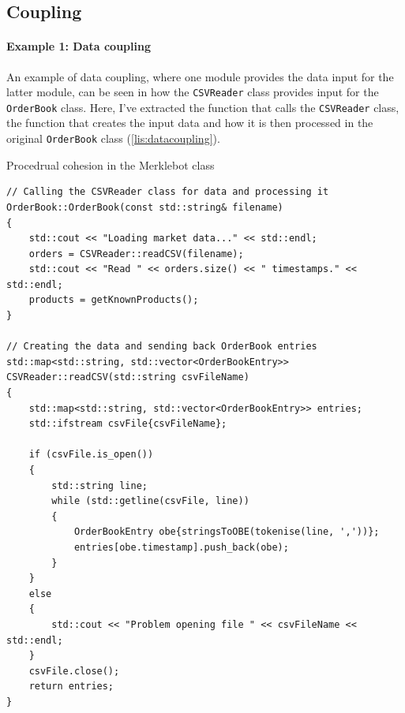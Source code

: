 \subsection{Coupling} %
\label{ssub:coupling}

\paragraph{Example 1: Data coupling} %
\label{par:paragraph_name}
An example of data coupling, where one module provides the data input for the latter module, can be seen in how the \texttt{CSVReader} class provides input for the \texttt{OrderBook} class. Here, I've extracted the function that calls the \texttt{CSVReader} class, the function that creates the input data and how it is then processed in the original \texttt{OrderBook} class (\autoref{lis:datacoupling}).


\begin{listing}[h]
	\caption{Procedrual cohesion in the Merklebot class}
	\label{lis:datacoupling}
	\begin{verbatim}
// Calling the CSVReader class for data and processing it
OrderBook::OrderBook(const std::string& filename)
{
	std::cout << "Loading market data..." << std::endl;
	orders = CSVReader::readCSV(filename);
	std::cout << "Read " << orders.size() << " timestamps." << std::endl;
	products = getKnownProducts();
}

// Creating the data and sending back OrderBook entries
std::map<std::string, std::vector<OrderBookEntry>> CSVReader::readCSV(std::string csvFileName)
{
	std::map<std::string, std::vector<OrderBookEntry>> entries;
	std::ifstream csvFile{csvFileName};

	if (csvFile.is_open())
	{
		std::string line;
		while (std::getline(csvFile, line))
		{
			OrderBookEntry obe{stringsToOBE(tokenise(line, ','))};
			entries[obe.timestamp].push_back(obe);
		}
	}
	else
	{
		std::cout << "Problem opening file " << csvFileName << std::endl;
	}
	csvFile.close();
	return entries;
}

		\end{verbatim}
\end{listing}



